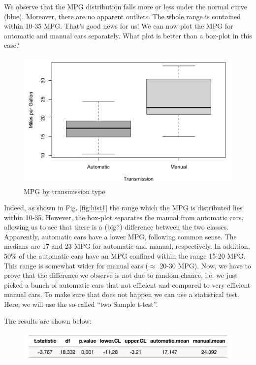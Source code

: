We observe that the MPG distribution falls more or less under the normal curve (blue). Moreover, there are no apparent outliers. The whole range is contained within 10-35 MPG. That's good news for us! We can now plot the MPG for automatic and manual cars separately. What plot is better than a box-plot in this case?

\begin{figure}[ht]
	\begin{center}
			\includegraphics[scale=0.35]{Parts/numerics/bplot1}
	\end{center}
	\caption{MPG by transmission type}
	\label{fig:bplot1}
\end{figure}

Indeed, as shown in Fig. \ref{fig:hist1} the range which the MPG is distributed lies within 10-35. However, the box-plot separates the manual from automatic cars, allowing us to see that there is a (big?) difference between the two classes. Apparently, automatic cars have a lower MPG, following common sense. The medians are 17 and 23 MPG for automatic and manual, respectively. In addition, 50$\%$ of the automatic cars have an MPG confined within the range 15-20 MPG. This range is somewhat wider for manual cars ($\approx$ 20-30 MPG). Now, we have to prove that the difference we observe is not due to random chance, i.e. we just picked a bunch of automatic cars that not efficient and compared to very efficient manual cars. To make sure that does not happen we can use a statistical test. Here, we will use the so-called ``two Sample t-test''. 

The results are shown below:

\begin{figure}[ht]
	\begin{center}
			\includegraphics[scale=0.5]{Parts/numerics/ttest}
	\end{center}
	\label{fig:ttest}
\end{figure}

